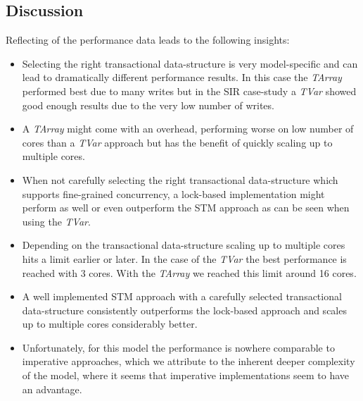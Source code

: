 \subsection{Discussion}
Reflecting of the performance data leads to the following insights:
\begin{itemize}	
	\item Selecting the right transactional data-structure is very model-specific and can lead to dramatically different performance results. In this case the \textit{TArray} performed best due to many writes but in the SIR case-study a \textit{TVar} showed good enough results due to the very low number of writes.
	\item A \textit{TArray} might come with an overhead, performing worse on low number of cores than a \textit{TVar} approach but has the benefit of quickly scaling up to multiple cores.
	\item When not carefully selecting the right transactional data-structure which supports fine-grained concurrency, a lock-based implementation might perform as well or even outperform the STM approach as can be seen when using the \textit{TVar}.
	\item Depending on the transactional data-structure scaling up to multiple cores hits a limit earlier or later. In the case of the \textit{TVar} the best performance is reached with 3 cores. With the \textit{TArray} we reached this limit around 16 cores.
	\item A well implemented STM approach with a carefully selected transactional data-structure consistently outperforms the lock-based approach and scales up to multiple cores considerably better.
	\item Unfortunately, for this model the performance is nowhere comparable to imperative approaches, which we attribute to the inherent deeper complexity of the model, where it seems that imperative implementations seem to have an advantage.
\end{itemize}